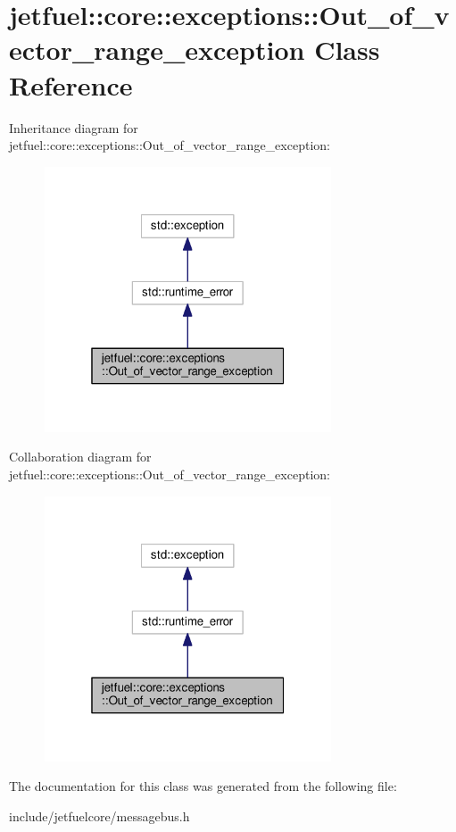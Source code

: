\hypertarget{classjetfuel_1_1core_1_1exceptions_1_1Out__of__vector__range__exception}{}\section{jetfuel\+:\+:core\+:\+:exceptions\+:\+:Out\+\_\+of\+\_\+vector\+\_\+range\+\_\+exception Class Reference}
\label{classjetfuel_1_1core_1_1exceptions_1_1Out__of__vector__range__exception}


Inheritance diagram for jetfuel\+:\+:core\+:\+:exceptions\+:\+:Out\+\_\+of\+\_\+vector\+\_\+range\+\_\+exception\+:
\nopagebreak
\begin{figure}[H]
\begin{center}
\leavevmode
\includegraphics[width=241pt]{classjetfuel_1_1core_1_1exceptions_1_1Out__of__vector__range__exception__inherit__graph}
\end{center}
\end{figure}


Collaboration diagram for jetfuel\+:\+:core\+:\+:exceptions\+:\+:Out\+\_\+of\+\_\+vector\+\_\+range\+\_\+exception\+:
\nopagebreak
\begin{figure}[H]
\begin{center}
\leavevmode
\includegraphics[width=241pt]{classjetfuel_1_1core_1_1exceptions_1_1Out__of__vector__range__exception__coll__graph}
\end{center}
\end{figure}


The documentation for this class was generated from the following file\+:\begin{DoxyCompactItemize}
\item 
include/jetfuelcore/messagebus.\+h\end{DoxyCompactItemize}
